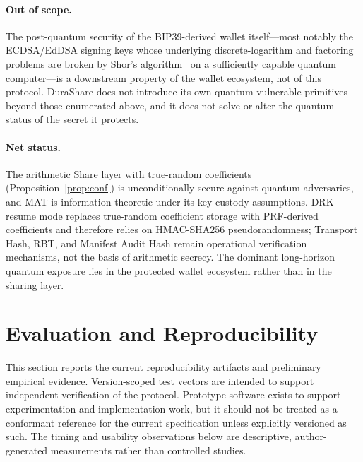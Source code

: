 \documentclass[11pt]{article}
\begin{document}
\paragraph{Out of scope.} The post-quantum security of the BIP39-derived wallet itself---most notably the ECDSA/EdDSA signing keys whose underlying discrete-logarithm and factoring problems are broken by Shor's algorithm~\cite{shor1994} on a sufficiently capable quantum computer---is a downstream property of the wallet ecosystem, not of this protocol. DuraShare does not introduce its own quantum-vulnerable primitives beyond those enumerated above, and it does not solve or alter the quantum status of the secret it protects.

\paragraph{Net status.} The arithmetic Share layer with true-random coefficients (Proposition~\ref{prop:conf}) is unconditionally secure against quantum adversaries, and MAT is information-theoretic under its key-custody assumptions. DRK resume mode replaces true-random coefficient storage with PRF-derived coefficients and therefore relies on HMAC-SHA256 pseudorandomness; Transport Hash, RBT, and Manifest Audit Hash remain operational verification mechanisms, not the basis of arithmetic secrecy. The dominant long-horizon quantum exposure lies in the protected wallet ecosystem rather than in the sharing layer.

\section{Evaluation and Reproducibility}
\label{sec:implementation}

This section reports the current reproducibility artifacts and preliminary empirical evidence. Version-scoped test vectors are intended to support independent verification of the protocol. Prototype software exists to support experimentation and implementation work, but it should not be treated as a conformant reference for the current specification unless explicitly versioned as such. The timing and usability observations below are descriptive, author-generated measurements rather than controlled studies.
\end{document}

